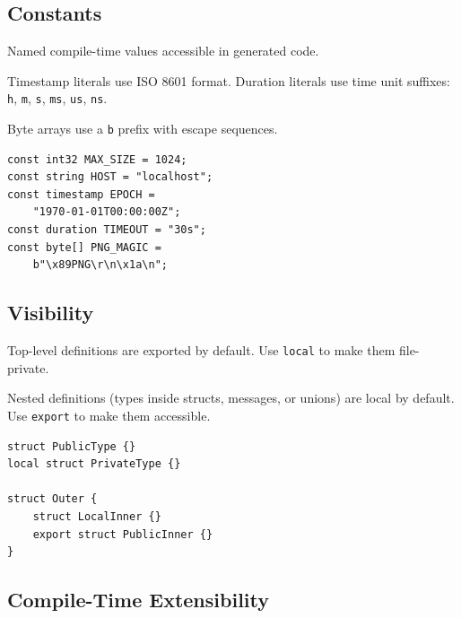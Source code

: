 \documentclass[10pt,onecolumn]{article}
\begin{document}
\begin{minipage}{\textwidth}
\subsection{Constants}

\begin{minipage}[t]{0.48\textwidth}
Named compile-time values accessible in generated code.

Timestamp literals use ISO 8601 format. Duration literals use time unit suffixes: \texttt{h}, \texttt{m}, \texttt{s}, \texttt{ms}, \texttt{us}, \texttt{ns}.

Byte arrays use a \texttt{b} prefix with escape sequences.
\end{minipage}\hfill
\begin{minipage}[t]{0.48\textwidth}
\begin{lstlisting}[language=bebop,aboveskip=0pt,belowskip=0pt]
const int32 MAX_SIZE = 1024;
const string HOST = "localhost";
const timestamp EPOCH =
    "1970-01-01T00:00:00Z";
const duration TIMEOUT = "30s";
const byte[] PNG_MAGIC =
    b"\x89PNG\r\n\x1a\n";
\end{lstlisting}
\end{minipage}

\vspace{12pt}
\subsection{Visibility}

\begin{minipage}[t]{0.52\textwidth}
\raggedright
Top-level definitions are exported by default. Use \texttt{local} to make them file-private.

Nested definitions (types inside structs, messages, or unions) are local by default. Use \texttt{export} to make them accessible.
\end{minipage}\hfill
\begin{minipage}[t]{0.44\textwidth}
\begin{lstlisting}[language=bebop,aboveskip=0pt,belowskip=0pt]
struct PublicType {}
local struct PrivateType {}

struct Outer {
    struct LocalInner {}
    export struct PublicInner {}
}
\end{lstlisting}
\end{minipage}
\end{minipage}

\subsection{Compile-Time Extensibility}
\end{document}
